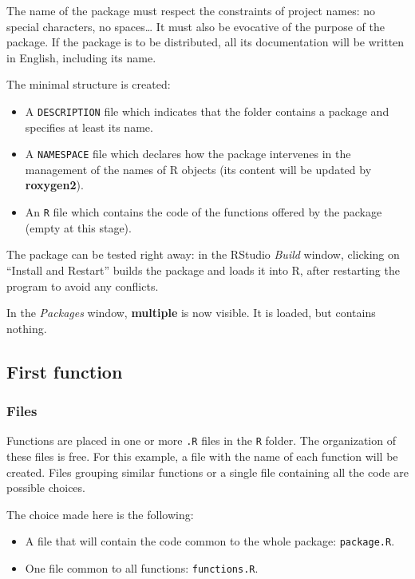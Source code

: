 \documentclass[
  12pt,
  american,
  a4paper,
  extrafontsizes,onecolumn,openright
  ]{memoir}
\providecommand{\tightlist}{%
  \setlength{\itemsep}{0pt}\setlength{\parskip}{0pt}}
\begin{document}
The name of the package must respect the constraints of project names: no special characters, no spaces\ldots{}
It must also be evocative of the purpose of the package.
If the package is to be distributed, all its documentation will be written in English, including its name.

The minimal structure is created:

\begin{itemize}
\tightlist
\item
  A \texttt{DESCRIPTION} file which indicates that the folder contains a package and specifies at least its name.
\item
  A \texttt{NAMESPACE} file which declares how the package intervenes in the management of the names of R objects (its content will be updated by \textbf{roxygen2}).
\item
  An \texttt{R} file which contains the code of the functions offered by the package (empty at this stage).
\end{itemize}

The package can be tested right away: in the RStudio \emph{Build} window, clicking on \enquote{Install and Restart} builds the package and loads it into R, after restarting the program to avoid any conflicts.

In the \emph{Packages} window, \textbf{multiple} is now visible.
It is loaded, but contains nothing.

\subsection{First function}\label{first-function}

\subsubsection{Files}\label{files}

Functions are placed in one or more \texttt{.R} files in the \texttt{R} folder.
The organization of these files is free.
For this example, a file with the name of each function will be created.
Files grouping similar functions or a single file containing all the code are possible choices.

The choice made here is the following:

\begin{itemize}
\tightlist
\item
  A file that will contain the code common to the whole package: \texttt{package.R}.
\item
  One file common to all functions: \texttt{functions.R}.
\end{itemize}
\end{document}
